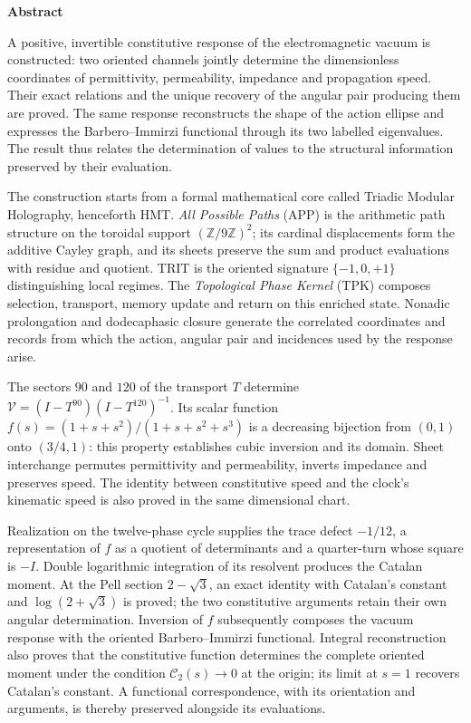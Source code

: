 \begin{center}\bfseries Abstract\end{center}
{}
\begingroup
\fontsize{9.5}{10.7}\selectfont
\setlength{\parskip}{1.5pt plus .5pt minus .5pt}
\fontsize{10.2}{12.1}\selectfont
\setlength{\parskip}{1.5pt plus .5pt minus .5pt}
\noindent
A positive, invertible constitutive response of the electromagnetic
vacuum is constructed: two oriented channels jointly determine the
dimensionless coordinates of permittivity, permeability, impedance and
propagation speed. Their exact relations and the unique recovery of the
angular pair producing them are proved. The same response reconstructs
the shape of the action ellipse and expresses the Barbero--Immirzi
functional through its two labelled eigenvalues. The result thus relates
the determination of values to the structural information preserved by
their evaluation.

The construction starts from a formal mathematical core called Triadic
Modular Holography, henceforth HMT. \emph{All Possible Paths} (APP) is
the arithmetic path structure on the toroidal support
$(\mathbb Z/9\mathbb Z)^2$; its cardinal displacements form the
additive Cayley graph, and its sheets preserve the sum and product
evaluations with residue and quotient. TRIT is the oriented signature
$\{-1,0,+1\}$ distinguishing local regimes. The
\emph{Topological Phase Kernel} (TPK) composes selection, transport,
memory update and return on this enriched state. Nonadic prolongation
and dodecaphasic closure generate the correlated coordinates and
records from which the action, angular pair and incidences used by the
response arise.

The sectors $90$ and $120$ of the transport $T$ determine
$\mathcal V=(I-T^{90})(I-T^{120})^{-1}$. Its scalar function
$f(s)=(1+s+s^2)/(1+s+s^2+s^3)$ is a decreasing bijection from $(0,1)$
onto $(3/4,1)$: this property establishes cubic inversion and its
domain. Sheet interchange permutes permittivity and permeability,
inverts impedance and preserves speed. The identity between
constitutive speed and the clock's kinematic speed is also proved
in the same dimensional chart.

Realization on the twelve-phase cycle supplies the trace defect
$-1/12$, a representation of $f$ as a quotient of determinants and a quarter-turn
whose square is $-I$. Double logarithmic integration of its resolvent
produces the Catalan moment. At the Pell section $2-\sqrt3$, an exact
identity with Catalan's constant and $\log(2+\sqrt3)$ is proved;
the two constitutive arguments retain their own angular determination.
Inversion of $f$ subsequently composes the vacuum response with the
oriented Barbero--Immirzi functional.
Integral reconstruction also proves that the constitutive function
determines the complete oriented moment under the condition
$\mathcal C_2(s)\to0$ at the origin; its limit at $s=1$ recovers
Catalan's constant. A functional correspondence, with its orientation
and arguments, is thereby preserved alongside its evaluations.

